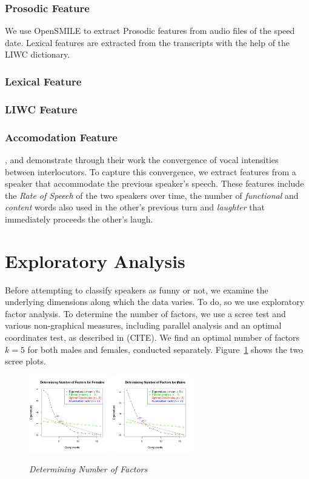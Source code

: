 \documentclass[a4paper]{article}
\begin{document}
\subsubsection{Prosodic Feature}
We use OpenSMILE to extract Prosodic features from audio files of the speed date. Lexical features are extracted from the transcripts with the help of the LIWC dictionary.

\subsubsection{Lexical Feature}

\subsubsection{LIWC Feature}

\subsubsection{Accomodation Feature}
\cite{natale}, \cite{ireland} and \cite{levitan} demonstrate through their work the convergence of vocal intensities between interlocutors. To capture this convergence, we extract features from a speaker that accommodate the previous speaker's speech. These features include the \textit{Rate of Speech} of the two speakers over time, the number of \textit{functional} and \textit{content} words also used in the other's previous turn and \textit{laughter} that immediately proceeds the other's laugh.

\section{Exploratory Analysis}
Before attempting to classify speakers as funny or not, we examine the underlying dimensions along which the data varies.  To do, so we use exploratory factor analysis. To determine the number of factors, we use a scree test and various non-graphical measures, including parallel analysis and an optimal coordinates test, as described in (CITE).  We find an optimal number of factors $k = 5$ for both males and females, conducted separately.  Figure~\ref{scree} shows the two scree plots.

\begin{figure}[t]
\includegraphics[width = 3.5cm]{graphics/ScreeFem.png}
\includegraphics[width = 3.5cm]{graphics/ScreeMale.png}
\caption{{\it Determining Number of Factors}\label{scree}}  
\label{scree}
\end{figure}
\end{document}
